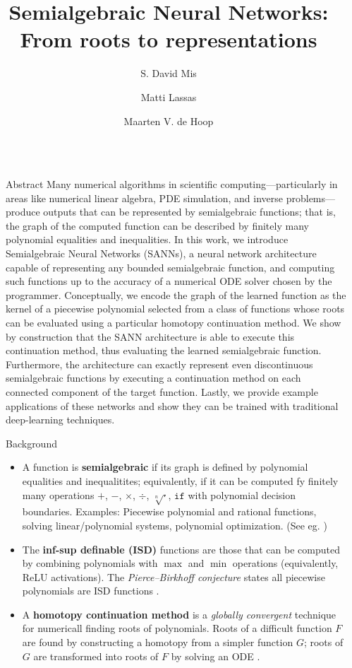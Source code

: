 \documentclass[final]{beamer}
\title{Semialgebraic Neural Networks: From roots to representations}
\author{S. David Mis \inst{1} \and Matti Lassas \inst{2} \and Maarten V. de Hoop \inst{1}}
\institute[shortinst]{\inst{1} Rice University \samelineand \inst{2} University of Helsinki}
\newlength{\sepwidth}
\newlength{\lrcolwidth}
\newcommand{\separatorcolumn}{\begin{column}{\sepwidth}\end{column}}
\begin{document}
\begin{frame}[t]
\begin{columns}[t]
\separatorcolumn

\begin{column}{\lrcolwidth}

  \begin{exampleblock}{Abstract}
    Many numerical algorithms in scientific computing---particularly in areas like numerical linear algebra, PDE simulation, and inverse problems---produce outputs that can be represented by semialgebraic functions; that is, the graph of the computed function can be described by finitely many polynomial equalities and inequalities. 
    In this work, we introduce Semialgebraic Neural Networks (SANNs), a neural network architecture capable of representing any bounded semialgebraic function, and computing such functions up to the accuracy of a numerical ODE solver chosen by the programmer.
    Conceptually, we encode the graph of the learned function as the kernel of a piecewise polynomial selected from a class of functions whose roots can be evaluated using a particular homotopy continuation method.
    We show by construction that the SANN architecture is able to execute this continuation method, thus evaluating the learned semialgebraic function.
    Furthermore, the architecture can exactly represent even discontinuous semialgebraic functions by executing a continuation method on each connected component of the target function.
    Lastly, we provide example applications of these networks and show they can be trained with traditional deep-learning techniques.
  \end{exampleblock}

  \begin{block}{Background}
    \begin{itemize}
      \item A function is \textbf{semialgebraic} if its graph is defined by polynomial equalities and inequalitites; equivalently, if it can be computed fy finitely many operations $+$, $-$, $\times$, $\div$, $\sqrt[n]{\cdot}$, $\texttt{if}$ with polynomial decision boundaries. Examples: Piecewise polynomial and rational functions, solving linear/polynomial systems, polynomial optimization. (See eg. \cite{bochnakRealAlgebraicGeometry1998})
      \item The \textbf{inf-sup definable (ISD)} functions are those that can be computed by combining polynomials with $\max$ and $\min$ operations (equivalently, ReLU activations). The \emph{Pierce--Birkhoff conjecture} states all piecewise polynomials are ISD functions \cite{mahePierceBirkhoffConjecture1984}.
      \item A \textbf{homotopy continuation method} is a \emph{globally convergent} technique for numericall finding roots of polynomials. Roots of a difficult function $F$ are found by constructing a homotopy from a simpler function $G$; roots of $G$ are transformed into roots of $F$ by solving an ODE \cite{chenHomotopyContinuationMethod2015}.
    \end{itemize}
  \end{block}


\end{column}
\end{columns}
\end{frame}
\end{document}
